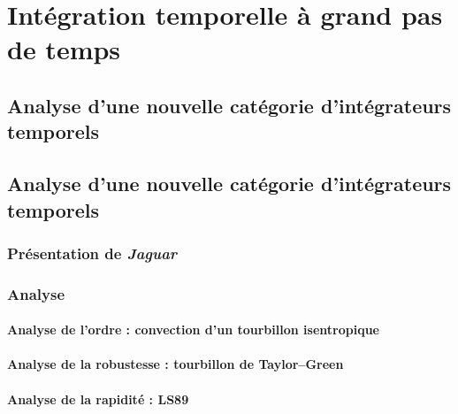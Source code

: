 \part{Intégration temporelle à grand pas de temps}

  \chapter{Analyse d’une nouvelle catégorie d’intégrateurs temporels}

  \chapter{Analyse d’une nouvelle catégorie d’intégrateurs temporels}
    \section{Présentation de \emph{Jaguar}}
    \section{Analyse}
      \subsection{Analyse de l'ordre : convection d'un tourbillon isentropique}
      \subsection{Analyse de la robustesse : tourbillon de Taylor--Green}
      \subsection{Analyse de la rapidité : LS89}



\pagebreak




